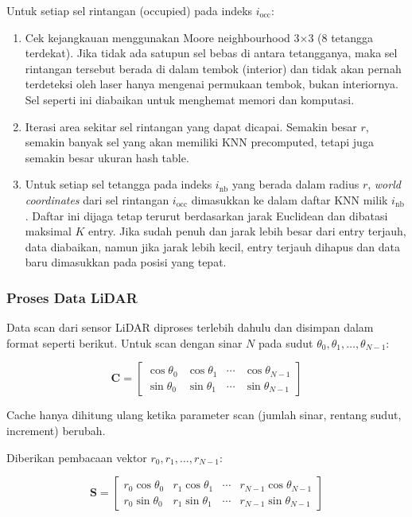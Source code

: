 Untuk setiap sel rintangan (occupied) pada indeks $i_{\text{occ}}$:
\begin{enumerate}
    \item Cek kejangkauan menggunakan Moore neighbourhood 3×3 (8 tetangga terdekat). Jika tidak ada satupun sel bebas di antara tetangganya, maka sel rintangan tersebut berada di dalam tembok (interior) dan tidak akan pernah terdeteksi oleh laser hanya mengenai permukaan tembok, bukan interiornya. Sel seperti ini diabaikan untuk menghemat memori dan komputasi.
    \item Iterasi area sekitar sel rintangan yang dapat dicapai. Semakin besar $r$, semakin banyak sel yang akan memiliki KNN precomputed, tetapi juga semakin besar ukuran hash table.
    \item Untuk setiap sel tetangga pada indeks $i_{\text{nb}}$ yang berada dalam radius $r$, \emph{world coordinates} dari sel rintangan $i_{\text{occ}}$ dimasukkan ke dalam daftar KNN milik $i_{\text{nb}}$. Daftar ini dijaga tetap terurut berdasarkan jarak Euclidean dan dibatasi maksimal $K$ entry. Jika sudah penuh dan jarak lebih besar dari entry terjauh, data diabaikan, namun jika jarak lebih kecil, entry terjauh dihapus dan data baru dimasukkan pada posisi yang tepat.
\end{enumerate}

\subsubsection{Proses Data LiDAR}
Data scan dari sensor LiDAR diproses terlebih dahulu dan disimpan dalam format seperti berikut.
Untuk scan dengan sinar $N$ pada sudut $\theta_0, \theta_1, \dots, \theta_{N-1}$:

\begin{equation}\mathbf{C} = \begin{bmatrix} \cos\theta_0 & \cos\theta_1 & \cdots & \cos\theta_{N-1} \\ \sin\theta_0 & \sin\theta_1 & \cdots & \sin\theta_{N-1} \end{bmatrix}\end{equation}

Cache hanya dihitung ulang ketika parameter scan (jumlah sinar, rentang sudut, increment) berubah.

Diberikan pembacaan vektor $r_0, r_1, \dots, r_{N-1}$:

\begin{equation}\mathbf{S} = \begin{bmatrix} r_0 \cos\theta_0 & r_1 \cos\theta_1 & \cdots & r_{N-1} \cos\theta_{N-1} \\ r_0 \sin\theta_0 & r_1 \sin\theta_1 & \cdots & r_{N-1} \sin\theta_{N-1} \end{bmatrix}\end{equation}

